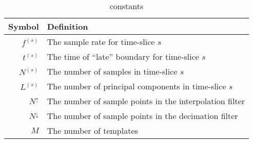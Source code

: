 \documentclass[letterpaper,11pt]{article}
\begin{document}
\begin{table}
\begin{tabular}{rl}
\hline
\textbf{Symbol} & \textbf{Definition} \\\hline
$f^{(s)}$ & The sample rate for time-slice $s$\\
$t^{(s)}$ & The time of ``late'' boundary for time-slice $s$\\
$N^{(s)}$ & The number of samples in time-slice $s$\\
$L^{(s)}$ & The number of principal components in time-slice $s$\\
$N^\uparrow$ & The number of sample points in the interpolation filter\\
$N^\downarrow$ & The number of sample points in the decimation filter\\
$M$ & The number of templates\\
\hline
\end{tabular}
\caption{constants}
\end{table}
\end{document}
